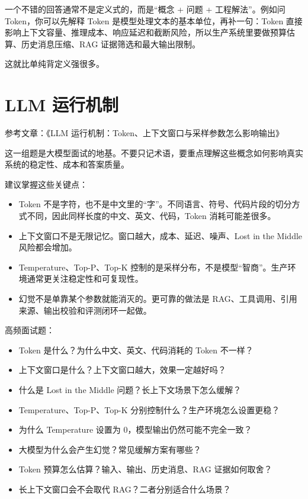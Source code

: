 \documentclass[10pt,a4paper]{ctexart}
\begin{document}
一个不错的回答通常不是定义式的，而是“概念 + 问题 + 工程解法”。例如问 Token，你可以先解释 Token 是模型处理文本的基本单位，再补一句：Token 直接影响上下文容量、推理成本、响应延迟和截断风险，所以生产系统里要做预算估算、历史消息压缩、RAG 证据筛选和最大输出限制。



这就比单纯背定义强很多。



\section{LLM 运行机制}


参考文章：《LLM 运行机制：Token、上下文窗口与采样参数怎么影响输出》



这一组题是大模型面试的地基。不要只记术语，要重点理解这些概念如何影响真实系统的稳定性、成本和答案质量。



建议掌握这些关键点：


\begin{itemize}[itemsep=2pt, topsep=4pt]
  \item Token 不是字符，也不是中文里的“字”。不同语言、符号、代码片段的切分方式不同，因此同样长度的中文、英文、代码，Token 消耗可能差很多。
  \item 上下文窗口不是无限记忆。窗口越大，成本、延迟、噪声、Lost in the Middle 风险都会增加。
  \item Temperature、Top-P、Top-K 控制的是采样分布，不是模型“智商”。生产环境通常更关注稳定性和可复现性。
  \item 幻觉不是单靠某个参数就能消灭的。更可靠的做法是 RAG、工具调用、引用来源、输出校验和评测闭环一起做。
\end{itemize}


高频面试题：


\begin{itemize}[itemsep=2pt, topsep=4pt]
  \item Token 是什么？为什么中文、英文、代码消耗的 Token 不一样？
  \item 上下文窗口是什么？上下文窗口越大，效果一定越好吗？
  \item 什么是 Lost in the Middle 问题？长上下文场景下怎么缓解？
  \item Temperature、Top-P、Top-K 分别控制什么？生产环境怎么设置更稳？
  \item 为什么 Temperature 设置为 0，模型输出仍然可能不完全一致？
  \item 大模型为什么会产生幻觉？常见缓解方案有哪些？
  \item Token 预算怎么估算？输入、输出、历史消息、RAG 证据如何取舍？
  \item 长上下文窗口会不会取代 RAG？二者分别适合什么场景？
\end{itemize}
\end{document}

